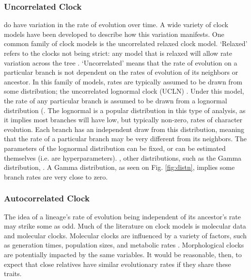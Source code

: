 \subsubsection{Uncorrelated Clock}
 do have variation in the rate of evolution over time. 
A wide variety of clock models have been developed to describe how this variation manifests.
One common family of clock models is the uncorrelated relaxed clock model.
`Relaxed' refers to the clocks not being strict: any model that is relaxed will allow rate variation across the tree \citep{Drummond2006, Drummond2007}.
`Uncorrelated' means that the rate of evolution on a particular branch is not dependent on the rates of evolution of its neighbors or ancestor.
In this family of models, rates are typically assumed to be drawn from some distribution; 
the uncorrelated lognormal clock (UCLN) .
Under this model, the rate of any particular branch is assumed to be drawn from a lognormal distribution (.
The lognormal is a popular distribution in this type of analysis, as it implies most branches will have low, but typically non-zero, rates of character evolution. 
Each branch has an independent draw from this distribution, meaning that the rate of a particular branch may be very different from its neighbors.
The parameters of the lognormal distribution can be fixed, or can be estimated themselves (i.e. are hyperparameters).
, other distributions, such as the Gamma distribution, .
A Gamma distribution, as seen on Fig. \ref{fig:distn}, implies some branch rates are very close to zero.



\subsubsection{Autocorrelated Clock}
The idea of %
a lineage's rate of evolution being independent of its ancestor's rate may strike some as odd. 
Much of the literature on clock models is  molecular data and molecular clocks.
Molecular clocks are influenced by a variety of factors, such as generation times, population sizes, and metabolic rates \citep{bromham1996, gaut1992}.
Morphological clocks are potentially impacted by the same variables. %
It would be reasonable, then, to expect that close relatives have similar evolutionary rates if they share these traits.

